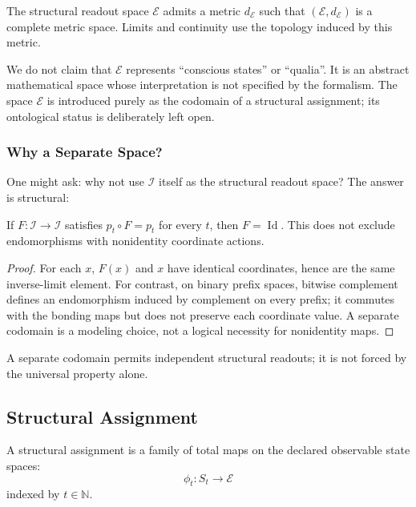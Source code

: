 \begin{hypothesis}\label{hyp:H3-metric}
The structural readout space $\mathcal{E}$ admits a metric $d_\mathcal{E}$ such that $(\mathcal{E}, d_\mathcal{E})$ is a complete metric space.
Limits and continuity use the topology induced by this metric.
\end{hypothesis}

\begin{remark}
We do not claim that $\mathcal{E}$ represents ``conscious states'' or ``qualia''. It is an abstract mathematical space whose interpretation is not specified by the formalism. The space $\mathcal{E}$ is introduced purely as the codomain of a structural assignment; its ontological status is deliberately left open.
\end{remark}

\subsubsection{Why a Separate Space?}

One might ask: why not use $\mathcal{I}$ itself as the structural readout space? The answer is structural:

\begin{proposition}
If $F:\mathcal I\to\mathcal I$ satisfies $p_t\circ F=p_t$ for every $t$, then $F=\operatorname{Id}$. This does not exclude endomorphisms with nonidentity coordinate actions.
\end{proposition}

\begin{proof}
For each $x$, $F(x)$ and $x$ have identical coordinates, hence are the same inverse-limit element. For contrast, on binary prefix spaces, bitwise complement defines an endomorphism induced by complement on every prefix; it commutes with the bonding maps but does not preserve each coordinate value. A separate codomain is a modeling choice, not a logical necessity for nonidentity maps.
\end{proof}

A separate codomain permits independent structural readouts; it is not forced by the universal property alone.

\subsection{Structural Assignment}

\begin{definition}\label{def:phenassign}
A structural assignment is a family of total maps on the declared observable state spaces:
\begin{equation}
    \phi_t: S_t \to \mathcal{E}
\end{equation}
indexed by $t \in \mathbb{N}$.
\end{definition}

